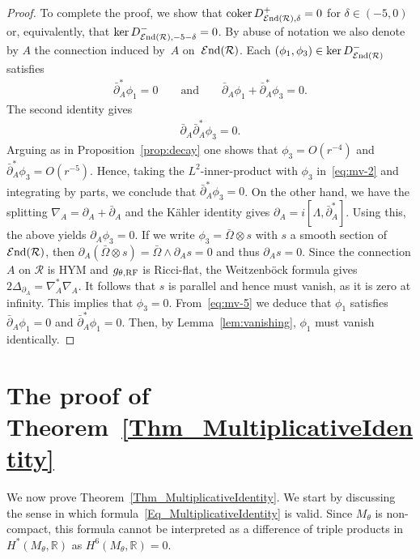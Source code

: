 \documentclass[pdftex]{sigma}
\numberwithin{equation}{section}
\newcommand{\cE}{\mathcal{E}}
\newcommand{\cR}{\mathcal{R}}
\newcommand{\R}{{\mathbb R}}
\newcommand{\cEnd}{\cE{\rm nd}}
\newcommand{\coker}{\operatorname{coker}}
\newcommand{\delbar}{\bar \del}
\newcommand{\del}{\partial}
\newcommand{\RF}{{\rm RF}}
\begin{document}
\begin{proof}
 To complete the proof, we show that $\coker
 D^+_{\cEnd(\cR),\delta}=0$ for $\delta\in(-5,0)$ or, equivalently,
 that $\ker D^{-}_{\cEnd(\cR),-5-\delta}=0$.  By abuse of notation we
 also denote by $A$ the connection induced by~$A$ on~$\cEnd(\cR)$.
 Each $(\phi_1, \phi_3) \in \ker D^{-}_{\cEnd(\cR)}$ satisf\/ies
 \begin{gather}\label{eq:mv-5}
   \delbar_A^* \phi_1 =0 \qquad\text{and}\qquad \delbar_A \phi_1 +
   \delbar_A^*\phi_3 =0.
 \end{gather}
 The second identity gives
 \begin{gather}\label{eq:mv-2}
   \delbar_A \delbar_A^* \phi_3 =0.
 \end{gather}
 Arguing as in Proposition~\ref{prop:decay} one shows that $\phi_3 =
 O(r^{-4})$ and $\delbar^*_A \phi_3 = O(r^{-5})$.  Hence, taking
 the $L^2$-inner-product with $\phi_3$ in~\eqref{eq:mv-2} and
 integrating by parts, we conclude that $\delbar_A^* \phi_3 =0$.  On
 the other hand, we have the splitting $\nabla_A = \partial_A +
 \delbar_A$ and the K\"ahler identity gives $\partial_A = i [\Lambda,
 \delbar^*_A]$. Using this, the above yields $\partial_A \phi_3 =0$.
 If we write $\phi_3 = \bar\Omega\otimes s$ with $s$ a smooth section
 of $\cEnd(\cR)$, then $\del_{A} (\bar\Omega \otimes s) = \bar\Omega
 \wedge \del_{A}s =0$ and thus $\del_{A}s=0$.  Since the connection
 $A$ on $\cR$ is HYM and $g_{\theta,\RF}$ is Ricci-f\/lat, the
 Weitzenb\"ock formula gives $2\Delta_{\del_A}=\nabla_A^*\nabla_A$.  It
 follows that $s$ is parallel and hence must vanish, as it is zero at
 inf\/inity.  This implies that $\phi_3 =0$. From~\eqref{eq:mv-5} we
 deduce that $\phi_1$ satisf\/ies $\delbar_A\phi_1 = 0$ and $\delbar_A^*
 \phi_1 =0$.  Then, by Lemma~\ref{lem:vanishing}, $\phi_1$ must vanish
 identically.
\end{proof}



\section{The proof of Theorem~\ref{Thm_MultiplicativeIdentity}}

\label{sec:mckay}
\label{Sec_AnalyticProof}

We now prove Theorem~\ref{Thm_MultiplicativeIdentity}.  We start by discussing the
sense in which formula~\eqref{Eq_MultiplicativeIdentity} is valid. Since
$M_{\theta}$ is non-compact, this formula cannot be interpreted as a
dif\/ference of triple products in $H^*(M_{\theta},\R)$ as
$H^6(M_{\theta},\R) =0$.
\end{document}

